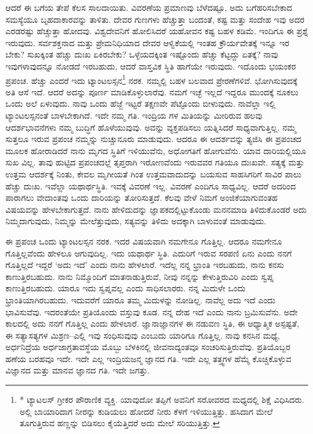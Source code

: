 ಆದರೆ ಈ ಬಗೆಯ ತೇಪೆ ಕೆಲಸ ಸಾಲದಾಯಿತು. ವಿವರಣೆಯ ಪ್ರಮಾಣವು ಬೆಳೆದಷ್ಟೂ, ಅದು ಬಗೆಹರಿಸಬೇಕಾದ ಸಮಸ್ಯೆಯೂ ಬೃಹದಾಕಾರವನ್ನು ತಾಳಿತು. ದೇವರ ಗುಣಗಳು ಹೆಚ್ಚುತ್ತಾ ಬಂದಂತೆ, ಕಷ್ಟ ಮತ್ತು ಸಂದೇಹ ಇವು ಅದರ ಎರಡರಷ್ಟು ಹೆಚ್ಚುತ್ತಾ ಹೋದವು. ವಿಶ್ವದೇವನಿಗೆ ಹೋಲಿಸಿದರೆ ಯಹೋವನ ಕಷ್ಟ ಬಹಳ ಕಡಿಮೆ. ಇಂದಿಗೂ ಈ ಪ್ರಶ್ನೆ ಇರುವುದು. ಸರ್ವಶಕ್ತನಾದ ಮತ್ತು ಪ್ರೇಮನಿಧಿಯಾದ ದೇವರ ಆಳ್ವಿಕೆಯಲ್ಲಿ ಇಂತಹ ಕ್ರೌರ್ಯವೇತಕ್ಕೆ ಇನ್ನೂ ಇರ ಬೇಕು? ಸುಖಕ್ಕಿಂತ ಹೆಚ್ಚು ದುಃಖ ಏಕಿರಬೇಕು? ಒಳ್ಳೆಯದಕ್ಕಿಂತ ಇಷ್ಟೊಂದು ಹೆಚ್ಚು ಕೆಟ್ಟದ್ದು ಏತಕ್ಕೆ? ನಾವು ಇವುಗಳಾವುದನ್ನೂ ನೋಡದೆ ಇರಬಹುದು, ಆದರೆ ವಾಸ್ತವಿಕ ಸ್ಥಿತಿ ಹಾಗೆಯೇ ಇರುವುದು. ಇದೊಂದು ಭಯಂಕರ ಪ್ರಪಂಚ. ಹೆಚ್ಚು ಎಂದರೆ ಇದು ಟ್ಯಾಂಟಲಸ್ಸನ\footnote{* ಟ್ಯಾಟಲಸ್​ ಗ್ರೀಕರ ಪೌರಾಣಿಕ ವ್ಯಕ್ತಿ. ಯಾವುದೋ ತಪ್ಪಿಗೆ ಅವನಿಗೆ ಸರೋವರದ ಮಧ್ಯದಲ್ಲಿ ಶಿಕ್ಷೆ ವಿಧಿಸಿದರು. ಅಲ್ಲಿ ಬಾಯಾರಿದಾಗ ನೀರನ್ನು ಕುಡಿಯಲು ಹೋದರೆ ನೀರು ಕೆಳಗೆ ಇಳಿಯುತ್ತಿತ್ತು. ಹಸಿದಾಗ ಮೇಲೆ ತೂಗುತ್ತಿರುವ ಹಣ್ಣನ್ನು ಬಿಡಿಸಲು ಕೈಯೆತ್ತಿದರೆ ಅದು ಮೇಲೆ ಸರಿಯುತ್ತಿತ್ತು.} ನರಕ. ನಮ್ಮಲ್ಲಿ ಬಹಳ ಬಲವಾದ ಪ್ರೇರಣೆಗಳಿವೆ. ಭೋಗಿಸುವುದಕ್ಕೆ ಅತಿ ಆಸೆ ಇದೆ. ಆದರೆ ಅದನ್ನು ಪೂರ್ಣ ಮಾಡಿಕೊಳ್ಳುಲಾರೆವು. ನಮಗೆ ಇಚ್ಛೆ ಇಲ್ಲದೆ ಇದ್ದರೂ ಮುಂದಕ್ಕೆ ನೂಕಲು ಒಂದು ಅಲೆ ಏಳುವುದು. ನಾವು ಒಂದು ಹೆಜ್ಜೆ ಇಟ್ಟರೆ ತಕ್ಷಣವೇ ಪೆಟ್ಟೊಂದು ಬೀಳುವುದು. ನಾವೆಲ್ಲಾ ಇಲ್ಲಿ ಟ್ಯಾಂಟಲಸ್ಸನಂತೆ ಬಾಳಬೇಕಾಗಿದೆ. ಇದೇ ನಮ್ಮ ಗತಿ. ಇಂದ್ರಿಯ ಗಳ ಮಿತಿಯನ್ನು ಮೀರಿರುವ ಹಲವು ಆದರ್ಶಭಾವನೆಗಳು ನಮ್ಮ ಬುದ್ಧಿಗೆ ಹೊಳೆಯುವುವು. ಅವನ್ನು ವ್ಯಕ್ತಪಡಿಸಲು ಯತ್ನಿಸಿದರೆ ಸಾಧ್ಯವಾಗುತ್ತಿಲ್ಲ. ನಮ್ಮ ಸುತ್ತಲೂ ಇರುವ ಪ್ರಪಂಚ ನಮ್ಮನ್ನು ನುಚ್ಚುನೂರು ಮಾಡುವುದು. ಆದರೂ ಈ ಆದರ್ಶವನ್ನು ತ್ಯಜಿಸಿ ಈ ಪ್ರಪಂಚದ ಮೂಲಕ ಹೋರಾಡಿದರೆ ನಾನು ಮೃಗದ ಸ್ಥಿತಿಗೆ ಇಳಿಯುವೆನು, ಅಧೋಗತಿಗೆ ಹೋಗುವೆನು. ಯಾವ ದಾರಿಯಲ್ಲಿಯೂ ಸುಖ ವಿಲ್ಲ. ತಾವು ಹುಟ್ಟಿದ ಪ್ರಪಂಚದಲ್ಲೆ ತೃಪ್ತರಾಗಿ ಇರೋಣವೆಂದು ಇರುವವರ ಗತಿಯೂ ದುಃಖವೇ. ಸತ್ಯಕ್ಕೆ ಮತ್ತು ಉತ್ತಮ ಆದರ್ಶಕ್ಕೆ ನಿಂತು, ಕೇವಲ ಮೃಗೀಯತೆ ಗಿಂತ ಉತ್ತಮವಾದುದನ್ನು ಬಯಸುವ ಸಾಹಸಿಗರಿಗೆ ಸಾವಿರ ಪಾಲು ಹೆಚ್ಚು ದುಃಖ. ಇವೆಲ್ಲಾ ಯಥಾರ್ಥಸ್ಥಿತಿ. ಇವಕ್ಕೆ ವಿವರಣೆ ಇಲ್ಲ. ವಿವರಣೆ ಎಂದಿಗೂ ಸಾಧ್ಯವಿಲ್ಲ. ಆದರೆ ಅದರಿಂದ ಪಾರಾಗಲು ವೇದಾಂತವು ಒಂದು ದಾರಿಯನ್ನು ತೋರಿಸುತ್ತದೆ. ಕೆಲವು ವೇಳೆ ನಿಮಗೆ ಅಂಜಿಕೆಯಾಗುವಂತಹ ವಿಷಯವನ್ನು ಹೇಳಬೇಕಾಗುತ್ತದೆ. ನಾನು ಹೇಳಿದುದನ್ನು ಜ್ಞಾಪಕದಲ್ಲಿಟ್ಟುಕೊಂಡು ಮನನಮಾಡಿ ತಿಳಿದುಕೊಂಡರೆ ಅದು ನಿಮ್ಮದಾಗುವುದು, ನಿಮ್ಮನ್ನು ಮೇಲೆತ್ತುವುದು, ಸತ್ಯವನ್ನು ತಿಳಿದು ಅದಕ್ಕಾಗಿ ಬಾಳುವಂತೆ ಮಾಡುವುದು.

ಈ ಪ್ರಪಂಚ ಒಂದು ಟ್ಯಾಂಟಲಸ್ಸನ ನರಕ. ಇದರ ವಿಷಯವಾಗಿ ನಮಗೇನೂ ಗೊತ್ತಿಲ್ಲ. ಆದರೂ ನಮಗೇನೂ ಗೊತ್ತಿಲ್ಲವೆಂದು ಹೇಳಲೂ ಆಗುವುದಿಲ್ಲ. ಇದು ಯಥಾರ್ಥ ಸ್ಥಿತಿ. ಎದುರಿಗೆ ಇರುವ ಸರಪಣಿ ಏನು ಎಂದು ನನಗೆ ಗೊತ್ತಿಲ್ಲದೆ ಇದ್ದರೆ ‘ಅದು ಇದೆ’ ಎಂದು ನಾನು ಹೇಳಲಾರೆ. ಇದೆಲ್ಲ ನನ್ನ ಭ್ರಾಂತಿ ಇರಬಹುದು, ನಾನು ಕನಸು ಕಾಣುತ್ತಿರಬಹುದು. ನಾನು ನಿಮ್ಮೊಂದಿಗೆ ಮಾತನಾಡುತ್ತಿರುವೆ, ನೀವು ನನ್ನನ್ನು ಕೇಳುತ್ತಿರುವಿರಿ ಎಂದು ಸ್ವಪ್ನ ಕಾಣುತ್ತಿರಬಹುದು. ಯಾರೂ ಇದು ಸ್ವಪ್ನವಲ್ಲ ಎಂದು ಸಾಧಿಸಲಾರರು. ನನ್ನ ಮಿದುಳೇ ಒಂದು ಭ್ರಾಂತಿಯಾಗಿರಬಹುದು. ಇದುವರೆಗೆ ಯಾರೂ ತಮ್ಮ ಮಿದುಳನ್ನು ನೋಡಿಲ್ಲ. ನಾವೆಲ್ಲ ಅದು ಇದೆ ಎಂದು ಭಾವಿಸುವೆವು. ಇದರಂತೆಯೇ ಪ್ರತಿಯೊಂದು ವಸ್ತುವು ಕೂಡ. ನನ್ನ ದೇಹ ಇದೆ ಎಂದು ನಾನು ಬ್ರಮಿಸುವೆನು. ಅದೇ ಕಾಲದಲ್ಲಿ ಅದು ನನಗೆ ಗೊತ್ತಿಲ್ಲ ಎಂದು ಹೇಳಲಾರೆ. ಜ್ಞಾನಾಜ್ಞಾನಗಳ ಈ ನಡುವಣ ಸ್ಥಿತಿ, ಈ ಆಧ್ಯಾತ್ಮಿಕ ಅಸ್ಪಷ್ಟತೆ, ಈ ಸತ್ಯಾಸತ್ಯಗಳ ಮಿಶ್ರಣ–ಎಲ್ಲಿ ಇವು ಸಂಧಿಸುವುವು ಎಂಬುದು ಯಾರಿಗೂ ಗೊತ್ತಿಲ್ಲ. ನಾವು ಕನಸಿನ ಮಧ್ಯೆ, ಅರ್ಧನಿದ್ರೆಯ ಅರ್ಧಜಾಗ್ರತಾವಸ್ಥೆಯ ಮೊಬ್ಬು ಬೆಳಕಿನಲ್ಲಿ ಜೀವನಾದ್ಯಂತವೂ ಸಂಚರಿಸುತ್ತಿರುವೆವು. ಪ್ರತಿಯೊಬ್ಬರ ಹಣೆಯ ಬರಹವೂ ಇದೇ. ಇದೇ ಎಲ್ಲ ಇಂದ್ರಿಯಜನ್ಮ ಜ್ಞಾನದ ಗತಿ. ಇದೇ ಎಲ್ಲ ತತ್ತ್ವಗಳ ಹೆಮ್ಮೆ ಕೊಚ್ಚಿಕೊಳ್ಳುವ ವಿಜ್ಞಾನದ ಮತ್ತು ಮಾನವ ಜ್ಞಾನದ ಗತಿ. ಇದೇ ಜಗತ್ತು.

